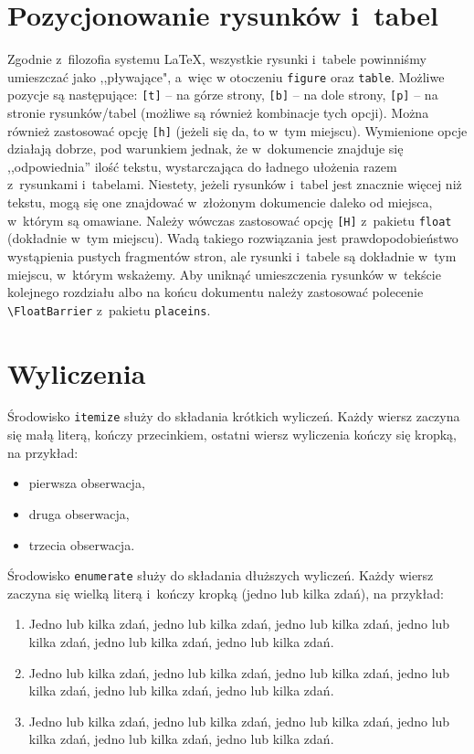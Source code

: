 \section{Pozycjonowanie rysunków i~tabel}
Zgodnie z~filozofia systemu \LaTeX, wszystkie rysunki i~tabele powinniśmy umieszczać jako ,,pływające", a~więc w otoczeniu \verb+figure+ oraz \verb+table+. Możliwe pozycje są następujące: \verb+[t]+ -- na górze strony, \verb+[b]+ -- na dole strony, \verb+[p]+ -- na stronie rysunków/tabel (możliwe są również kombinacje tych opcji). Można również zastosować opcję \verb+[h]+ (jeżeli się da, to w~tym miejscu). Wymienione opcje działają dobrze, pod warunkiem jednak, że w~dokumencie znajduje się ,,odpowiednia'' ilość tekstu, wystarczająca do ładnego ułożenia razem z~rysunkami i~tabelami. Niestety, jeżeli rysunków i~tabel jest znacznie więcej niż tekstu, mogą się one znajdować w~złożonym dokumencie daleko od miejsca, w~którym są omawiane. Należy wówczas zastosować opcję \verb+[H]+ z~pakietu \verb+float+ (dokładnie w~tym miejscu). Wadą takiego rozwiązania jest prawdopodobieństwo wystąpienia pustych fragmentów stron, ale rysunki i~tabele są dokładnie w~tym miejscu, w~którym wskażemy. Aby uniknąć umieszczenia rysunków w~tekście kolejnego rozdziału albo na końcu dokumentu należy zastosować polecenie \verb+\FloatBarrier+ z~pakietu \verb+placeins+.

\section{Wyliczenia}
Środowisko \verb+itemize+ służy do składania krótkich wyliczeń. Każdy wiersz zaczyna się małą literą, kończy przecinkiem, ostatni wiersz wyliczenia kończy się kropką, na przykład:
\begin{itemize}
\item pierwsza obserwacja,
\item druga obserwacja,
\item trzecia obserwacja.
\end{itemize}
Środowisko \verb+enumerate+ służy do składania dłuższych wyliczeń. Każdy wiersz zaczyna się wielką literą i~kończy kropką (jedno lub kilka zdań), na przykład:
\begin{enumerate}
\item Jedno lub kilka zdań, jedno lub kilka zdań, jedno lub kilka zdań, jedno lub kilka zdań, jedno lub kilka zdań, jedno lub kilka zdań.
\item Jedno lub kilka zdań, jedno lub kilka zdań, jedno lub kilka zdań, jedno lub kilka zdań, jedno lub kilka zdań, jedno lub kilka zdań.
\item Jedno lub kilka zdań, jedno lub kilka zdań, jedno lub kilka zdań, jedno lub kilka zdań, jedno lub kilka zdań, jedno lub kilka zdań.
\end{enumerate}

